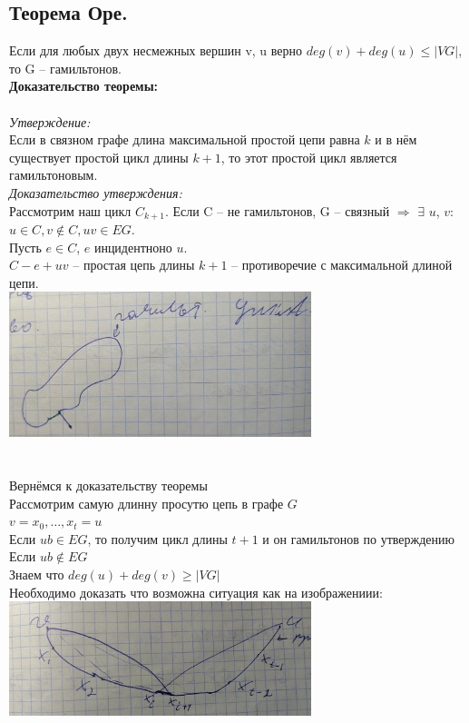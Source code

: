 \documentclass[12pt]{article}
\begin{document}
\subsection{Теорема Оре.}
	Если для любых двух несмежных вершин v, u верно $deg(v) + deg(u) \leqslant |VG|$, то G – гамильтонов.\\
	\textbf{Доказательство теоремы:}\\\\
		\textit{Утверждение:}\\
		Если в связном графе длина максимальной простой цепи равна $k$ и в нём существует простой цикл длины $k + 1$, то этот простой цикл является гамильтоновым.\\
	\textit{Доказательство утверждения:}\\
		Рассмотрим наш цикл $C_{k+1}$. Если C – не гамильтонов, G – связный $\Rightarrow$ $\exists$ $u$, $v$: $u \in C, v \notin C, uv \in EG$.\\ Пусть $e \in C$, $e$ инцидентноно $u$.\\
		$C - e + uv$ – простая цепь длины $k + 1$ – противоречие с максимальной длиной цепи.\\
		\includegraphics[width=250pt]{2}\\
	\qedsymbol\\\\
		Вернёмся к доказательству теоремы\\
		Рассмотрим самую длинну просутю цепь в графе $G$\\
		$v = x_0,\dotsc,x_t = u$\\
		Если $ub \in EG$, то получим цикл длины $t+1$ и он гамильтонов по утверждению\\
		Если $ub \notin EG$\\
		Знаем что $deg(u) + deg(v) \geqslant |VG|$\\
		Необходимо доказать что возможна ситуация как на изображениии:\\
		\includegraphics[width=250pt]{3}\\
\end{document}
